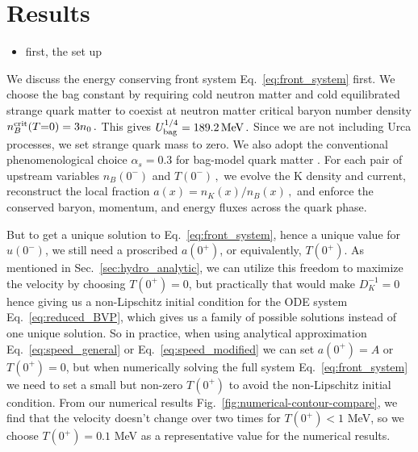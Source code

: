 \documentclass[10pt,superscriptaddress,
amsmath,aps,prc,twocolumn,nofootinbib,floatfix]{revtex4-1}
\newcommand{\JS}[1]{{\color{violet}#1}}
\newcommand{\JScom}[1]{\textsf{\color{violet} [\textsuperscript{JS}#1]}}
\newcommand{\MeV}{\text{MeV}}
\begin{document}
\fi

\section{Results}
\label{sec:results}

\begin{itemize}
  \item first, the set up
\end{itemize}

We discuss the energy conserving front system Eq.~\eqref{eq:front_system} first. We choose the bag constant by requiring cold neutron matter and cold equilibrated strange quark matter to coexist at neutron matter critical baryon number density $n_B^{\rm crit}(T{=}0)=3n_0\,.$
This gives $U_{\rm bag}^{1/4}=189.2\,\MeV\,.$
Since we are not including Urca processes, we set strange quark mass to zero.
We also adopt the conventional phenomenological choice $\alpha_s=0.3$ for bag-model quark matter \JS{\cite{Farhi:1984qu,Madsen:1998uh}}. %
For each pair of upstream variables $n_B(0^-)$ and $T(0^-)\,,$ we evolve the K density and current, reconstruct the local fraction $a(x)=n_K(x)/n_B(x)\,,$ and enforce the conserved baryon, momentum, and energy fluxes across the quark phase.

But to get a unique solution to Eq.~\eqref{eq:front_system}, hence a unique value for $u(0^-)$, we still need a proscribed $a(0^+)$, or equivalently, $T(0^+)$. 
As mentioned in Sec.~\ref{sec:hydro_analytic}, we can utilize this freedom to maximize the velocity by choosing $T(0^+) = 0$, but practically that would make $D_K^{-1} = 0$ hence giving us a non-Lipschitz initial condition for the ODE system Eq.~\eqref{eq:reduced_BVP}, which gives us a family of possible solutions instead of one unique solution. 
So in practice, when using analytical approximation Eq.~\eqref{eq:speed_general} or Eq.~\eqref{eq:speed_modified} we can set $a(0^+) = A$ or $T(0^+) = 0$, but when numerically solving the full system Eq.~\eqref{eq:front_system} we need to set a small but non-zero $T(0^+)$ to avoid the non-Lipschitz initial condition.
From our numerical results Fig.~\ref{fig:numerical-contour-compare}, we find that the velocity doesn't change over two times for $T(0^+) < 1$ MeV, so we choose $T(0^+) = 0.1$ MeV as a representative value for the numerical results.
\end{document}

